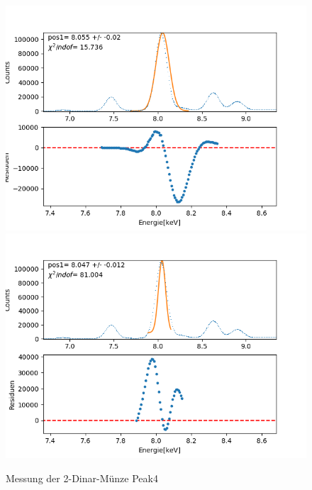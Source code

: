 \documentclass[12pt,a4paper]{article}
\begin{document}
\begin{figure}[H]
\centering
\includegraphics[scale=0.49]{Bilder/roentgen_spektren/denar/den4_1.png}
\includegraphics[scale=0.49]{Bilder/roentgen_spektren/denar/den4_2.png}
\caption{Messung der 2-Dinar-Münze Peak4}
\end{figure}
\end{document}
